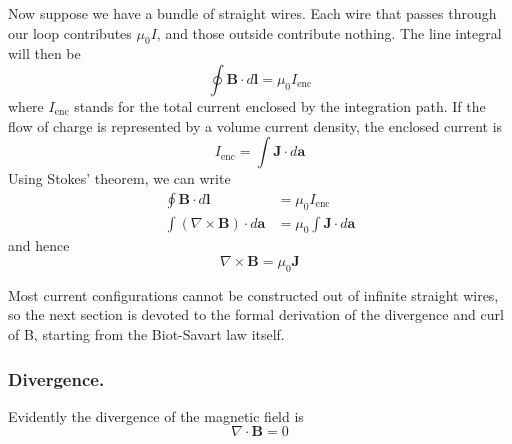 \documentclass[../../../main.tex]{subfiles}
\begin{document}
Now suppose we have a bundle of straight wires. Each wire that passes through our loop contributes $\mu_0 I$, and those outside contribute nothing. The line integral will then be
\begin{equation*}
    \oint \mathbf{B}\cdot d\mathbf{l}=\mu_0I_{\text{enc}}
\end{equation*}
where $I_{\text{enc}}$ stands for the total current enclosed by the integration path. If the ﬂow 
of charge is represented by a volume current density, the enclosed current is
\begin{equation*}
    I_{\text{enc}}=\int \mathbf{J}\cdot d\mathbf{a}
\end{equation*}
Using Stokes' theorem, we can write 
\begin{align*}
    \oint \mathbf{B}\cdot d\mathbf{l}&=\mu_0I_{\text{enc}}\\
    \int(\nabla \times \mathbf{B})\cdot d\mathbf{a}&=\mu_0\int \mathbf{J}\cdot d\mathbf{a}
\end{align*}
and hence
\begin{equation*}
    \nabla \times \mathbf{B}=\mu_0\mathbf{J} 
\end{equation*}

Most current conﬁgurations cannot be constructed out of inﬁnite straight wires, so the next section is devoted to the formal derivation of the divergence and curl of B, starting from the Biot-Savart law itself.

\subsubsection{Divergence.} Evidently the divergence of the magnetic ﬁeld is
\begin{equation*}
    \nabla \cdot \mathbf{B}=0
\end{equation*}
\end{document}
